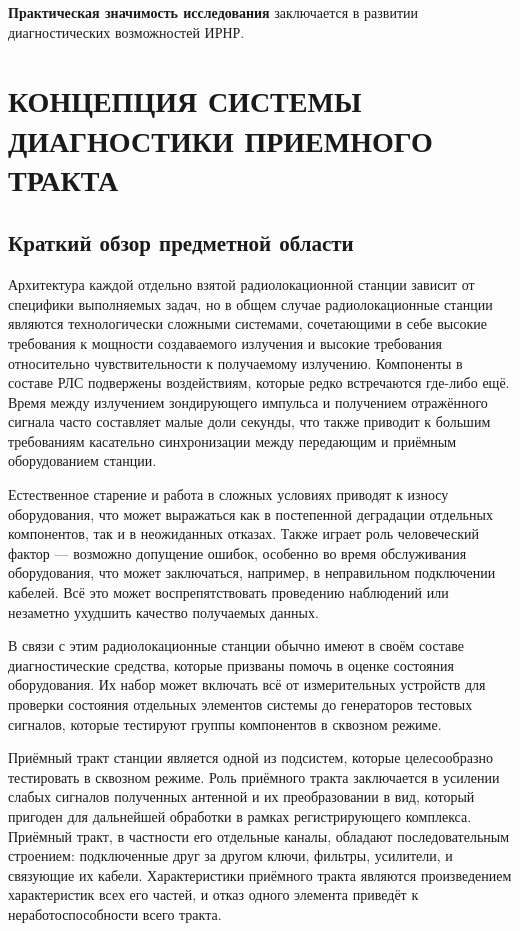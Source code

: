 \documentclass{report}
\begin{document}
{\bf Практическая значимость исследования} заключается в развитии диагностических возможностей ИРНР.

% 
\setcounter{section}{0} %
\setcounter{subsection}{0} %
\setcounter{equation}{0} %

\chapter{КОНЦЕПЦИЯ СИСТЕМЫ ДИАГНОСТИКИ ПРИЕМНОГО ТРАКТА}

\section{Краткий обзор предметной области}

Архитектура каждой отдельно взятой радиолокационной станции зависит от специфики выполняемых задач, но в общем случае радиолокационные станции являются технологически сложными системами, сочетающими в себе высокие требования к мощности создаваемого излучения и высокие требования относительно чувствительности к получаемому излучению. Компоненты в составе РЛС подвержены воздействиям, которые редко встречаются где-либо ещё. Время между излучением зондирующего импульса и получением отражённого сигнала часто составляет малые доли секунды, что также приводит к большим требованиям касательно синхронизации между передающим и приёмным оборудованием станции.

Естественное старение и работа в сложных условиях приводят к износу оборудования, что может выражаться как в постепенной деградации отдельных компонентов, так и в неожиданных отказах. Также играет роль человеческий фактор --- возможно допущение ошибок, особенно во время обслуживания оборудования, что может заключаться, например, в неправильном подключении кабелей. Всё это может воспрепятствовать проведению наблюдений или незаметно ухудшить качество получаемых данных.

В связи с этим радиолокационные станции обычно имеют в своём составе диагностические средства, которые призваны помочь в оценке состояния оборудования. Их набор может включать всё от измерительных устройств для проверки состояния отдельных элементов системы до генераторов тестовых сигналов, которые тестируют группы компонентов в сквозном режиме.

Приёмный тракт станции является одной из подсистем, которые целесообразно тестировать в сквозном режиме. Роль приёмного тракта заключается в усилении слабых сигналов полученных антенной и их преобразовании в вид, который пригоден для дальнейшей обработки в рамках регистрирующего комплекса. Приёмный тракт, в частности его отдельные каналы, обладают последовательным строением: подключенные друг за другом ключи, фильтры, усилители, и связующие их кабели. Характеристики приёмного тракта являются произведением характеристик всех его частей, и отказ одного элемента приведёт к неработоспособности всего тракта.
\end{document}
